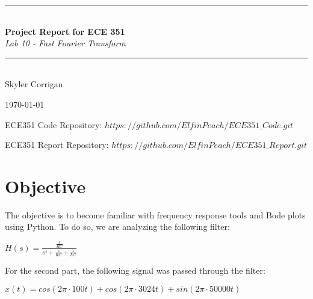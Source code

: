 \documentclass[12pt,a4paper]{article}
\newcommand{\HRule}{\rule{\linewidth}{0.5mm}}
\begin{document}
\begin{titlepage}
\begin{center}



\HRule \\[0.4cm]
{ \LARGE 
  \textbf{Project Report for ECE 351}\\[0.4cm]
  \emph{Lab 10 - Fast Fourier Transform}\\[0.4cm]
}
\HRule \\[1.5cm]



{ \large
  Skyler Corrigan \\[0.1cm]
}

\vfill



{\large \today}

{ \large
ECE351 Code Repository: 
\hyperlink{$https://github.com/ElfinPeach/ECE351\_Code.git$}{$https://github.com/ElfinPeach/ECE351\_Code.git$}

ECE351 Report Repository: 
\hyperlink{$https://github.com/ElfinPeach/ECE351\_Report.git$}{$https://github.com/ElfinPeach/ECE351\_Report.git$}
}
 
\end{center}
\end{titlepage}


\newpage

\tableofcontents
{}
\newpage
\setcounter{page}{1}

\section{Objective}
The objective is to become familiar with frequency response tools and Bode plots using Python. To do so, we are analyzing the following filter:
\begin{center}
    $H(s)=\frac{\frac{s}{RC}}{s^s+\frac{s}{RC}+\frac{1}{LC}}$
\end{center}
For the second part, the following signal was passed through the filter:
\begin{center}
    $x(t)=cos(2\pi \cdot 100t)+cos(2\pi \cdot 3024t)+sin(2\pi \cdot 50000t)$
\end{center}
\end{document}
